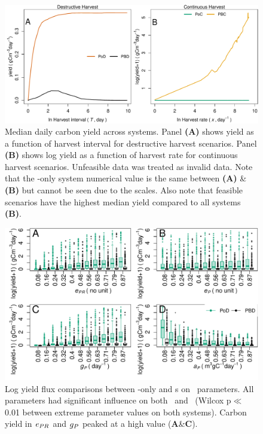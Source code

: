 \documentclass[../thesis.tex]{subfiles} %
\begin{document}
\begin{figure}[H]
    \centering
    \includegraphics[width=\linewidth]{result/DailyYield.pdf}
    \caption[Median daily carbon yield across systems]{Median daily carbon yield across systems.  Panel \textbf{(A)} shows yield as a function of harvest interval for destructive harvest scenarios.  Panel \textbf{(B)} shows log yield as a function of harvest rate for continuous harvest scenarios.  Unfeasible data was treated as invalid data.  Note that the \phy-only system numerical value is the same between \textbf{(A)} \& \textbf{(B)} but cannot be seen due to the scales.  Also note that feasible scenarios have the highest median yield compared to all systems \textbf{(B)}.\lnExplain}
    \label{f:ydDaily}
\end{figure}

\begin{figure}[H]
    \centering
    \includegraphics[width=\linewidth]{result/bacEff1.pdf}
    \caption[Log yield flux comparisons between feasible \phy-only and \pbs s]{Log yield flux comparisons between \phy-only and \pbs s on \phy\ parameters.  All parameters had significant influence on both \PoN\ and \PBN\ (Wilcox p$\ll$0.01 between extreme parameter values on both systems).  Carbon yield in $e_{PR}$ and $g_P$ peaked at a high value (\textbf{A}\&\textbf{C}).\lnExplain}
    \label{f:bacEffect}
\end{figure}
\end{document}
